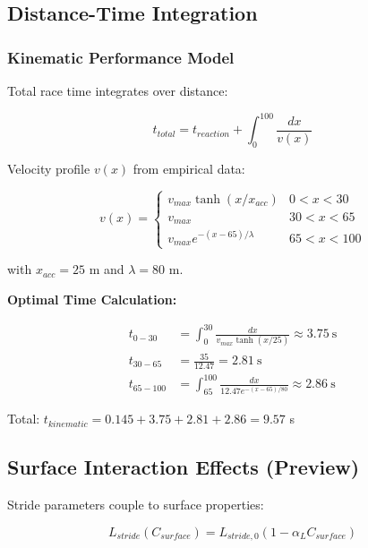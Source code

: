 \begin{figure}[htbp]
    \label{fig:frequency_decomposition}
    \end{figure}

\subsection{Distance-Time Integration}

\subsubsection{Kinematic Performance Model}

Total race time integrates over distance:

\begin{equation}
t_{total} = t_{reaction} + \int_0^{100} \frac{dx}{v(x)}
\label{eq:kinematic_time_integral}
\end{equation}

Velocity profile $v(x)$ from empirical data:

\begin{equation}
v(x) = \begin{cases}
v_{max} \tanh(x/x_{acc}) & 0 < x < 30 \\
v_{max} & 30 < x < 65 \\
v_{max} e^{-(x-65)/\lambda} & 65 < x < 100
\end{cases}
\label{eq:velocity_distance_profile}
\end{equation}

with $x_{acc} = 25$ m and $\lambda = 80$ m.

\textbf{Optimal Time Calculation:}

\begin{align}
t_{0-30} &= \int_0^{30} \frac{dx}{v_{max} \tanh(x/25)} \approx 3.75~\text{s} \\
t_{30-65} &= \frac{35}{12.47} = 2.81~\text{s} \\
t_{65-100} &= \int_{65}^{100} \frac{dx}{12.47 e^{-(x-65)/80}} \approx 2.86~\text{s}
\end{align}

Total: $t_{kinematic} = 0.145 + 3.75 + 2.81 + 2.86 = 9.57$ s

\subsection{Surface Interaction Effects (Preview)}

Stride parameters couple to surface properties:

\begin{equation}
L_{stride}(C_{surface}) = L_{stride,0} (1 - \alpha_L C_{surface})
\label{eq:stride_surface_coupling}
\end{equation}

